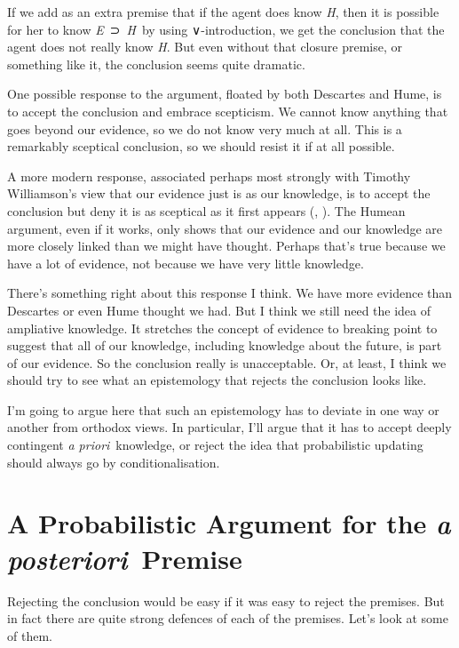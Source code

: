 \documentclass[
  10pt,
  letterpaper,
  DIV=11,
  numbers=noendperiod,
  twoside]{scrartcl}
\begin{document}
If we add as an extra premise that if the agent does know \emph{H}, then
it is possible for her to know \emph{E}~⊃~\emph{H}~by using
∨-introduction, we get the conclusion that the agent does not really
know \emph{H}. But even without that closure premise, or something like
it, the conclusion seems quite dramatic.

One possible response to the argument, floated by both Descartes and
Hume, is to accept the conclusion and embrace scepticism. We cannot know
anything that goes beyond our evidence, so we do not know very much at
all. This is a remarkably sceptical conclusion, so we should resist it
if at all possible.

A more modern response, associated perhaps most strongly with Timothy
Williamson's view that our evidence just is as our knowledge, is to
accept the conclusion but deny it is as sceptical as it first appears
(,
). The Humean argument, even
if it works, only shows that our evidence and our knowledge are more
closely linked than we might have thought. Perhaps that's true because
we have a lot of evidence, not because we have very little knowledge.

There's something right about this response I think. We have more
evidence than Descartes or even Hume thought we had. But I think we
still need the idea of ampliative knowledge. It stretches the concept of
evidence to breaking point to suggest that all of our knowledge,
including knowledge about the future, is part of our evidence. So the
conclusion really is unacceptable. Or, at least, I think we should try
to see what an epistemology that rejects the conclusion looks like.

I'm going to argue here that such an epistemology has to deviate in one
way or another from orthodox views. In particular, I'll argue that it
has to accept deeply contingent \emph{a priori}~knowledge, or reject the
idea that probabilistic updating should always go by conditionalisation.

\section{\texorpdfstring{A Probabilistic Argument for the \emph{a
posteriori}~Premise}{A Probabilistic Argument for the a posteriori~Premise}}\label{a-probabilistic-argument-for-the-a-posteriori-premise}

Rejecting the conclusion would be easy if it was easy to reject the
premises. But in fact there are quite strong defences of each of the
premises. Let's look at some of them.
\end{document}
